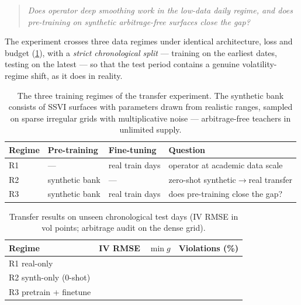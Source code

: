 \begin{quote}\itshape
Does operator deep smoothing work in the low-data daily regime, and does
pre-training on synthetic arbitrage-free surfaces close the gap?
\end{quote}

The experiment crosses three data regimes under identical architecture,
loss and budget (\cref{tab:regimes}), with a \emph{strict chronological
split} --- training on the earliest dates, testing on the latest --- so that
the test period contains a genuine volatility-regime shift, as it does in
reality.

\begin{table}[t]
  \centering
  \caption[Transfer-experiment regimes]{The three training regimes of the
  transfer experiment. The synthetic bank consists of SSVI surfaces with
  parameters drawn from realistic ranges, sampled on sparse irregular grids
  with multiplicative noise --- arbitrage-free teachers in unlimited supply.}
  \label{tab:regimes}
  \begin{tabular}{llll}
    \toprule
    Regime & Pre-training & Fine-tuning & Question \\
    \midrule
    R1 & --- & real train days & operator at academic data scale \\
    R2 & synthetic bank & --- & zero-shot synthetic$\to$real transfer \\
    R3 & synthetic bank & real train days & does pre-training close the gap? \\
    \bottomrule
  \end{tabular}
\end{table}

\begin{table}[t]
  \centering
  \caption[Transfer-experiment results]{Transfer results on unseen
  chronological test days (IV RMSE in vol points; arbitrage audit on the
  dense grid). }
  \label{tab:transfer}
  \begin{tabular}{lS[table-format=1.3]S[table-format=+1.3]S[table-format=2.1]}
    \toprule
    Regime & {IV RMSE} & {$\min g$} & {Violations (\%)} \\
    \midrule
    R1 real-only            & {\TODO{}} & {\TODO{}} & {\TODO{}} \\
    R2 synth-only (0-shot)  & {\TODO{}} & {\TODO{}} & {\TODO{}} \\
    R3 pretrain + finetune  & {\TODO{}} & {\TODO{}} & {\TODO{}} \\
    \bottomrule
  \end{tabular}
\end{table}


